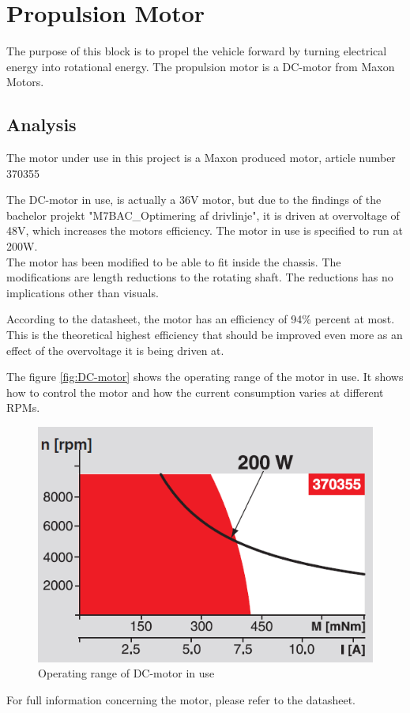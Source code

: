 \section{Propulsion Motor}
The purpose of this block is to propel the vehicle forward by turning electrical energy into rotational energy. The propulsion motor is a DC-motor from Maxon Motors. 

\subsection{Analysis}
The motor under use in this project is a Maxon produced motor, article number 370355 \cite{DC-Motor}

The DC-motor in use, is actually a 36V motor, but due to the findings of the bachelor projekt "M7BAC\_Optimering af drivlinje", it is driven at overvoltage of 48V, which increases the motors efficiency. The motor in use is specified to run at 200W.\\
The motor has been modified to be able to fit inside the chassis. The modifications are length reductions to the rotating shaft. The reductions has no implications other than visuals. 

According to the datasheet, the motor has an efficiency of 94\% percent at most. This is the theoretical highest efficiency that should be improved even more as an effect of the overvoltage it is being driven at. 

The figure \vref{fig:DC-motor} shows the operating range of the motor in use. It shows how to control the motor and how the current consumption varies at different RPMs.

\begin{figure}[H]
	\centering
	\includegraphics[width=0.6\linewidth]{Hardware/Pictures/DC-motor_diagram}
	\caption{Operating range of DC-motor in use}
	\label{fig:DC-motor}
\end{figure}

For full information concerning the motor, please refer to the datasheet.

